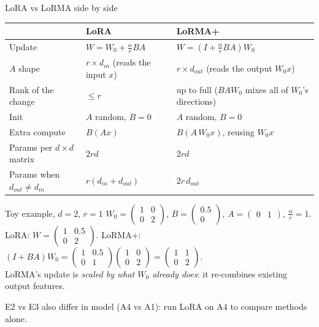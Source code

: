 \documentclass[aspectratio=169,11pt]{beamer}
\begin{document}
\begin{frame}{LoRA vs LoRMA side by side}
  \footnotesize
  \begin{center}
  \begin{tabular}{@{}lll@{}}
    \toprule
    & LoRA & LoRMA+ \\
    \midrule
    Update & $W = W_0 + \frac{\alpha}{r}BA$ & $W = (I + \frac{\alpha}{r}BA)W_0$ \\
    $A$ shape & $r \times d_{in}$ (reads the input $x$) & $r \times d_{out}$ (reads the output $W_0x$) \\
    Rank of the change & $\le r$ & up to full ($BAW_0$ mixes all of $W_0$'s directions) \\
    Init & $A$ random, $B=0$ & $A$ random, $B=0$ \\
    Extra compute & $B(Ax)$ & $B(A\,W_0x)$, reusing $W_0x$ \\
    Params per $d\times d$ matrix & $2rd$ & $2rd$ \\
    Params when $d_{out}\ne d_{in}$ & $r(d_{in}+d_{out})$ & $2r\,d_{out}$ \\
    \bottomrule
  \end{tabular}
  \end{center}
  \begin{block}{Toy example, $d=2$, $r=1$}
    $W_0 = \begin{pmatrix}1&0\\0&2\end{pmatrix}$, $B = \begin{pmatrix}0.5\\0\end{pmatrix}$, $A = \begin{pmatrix}0&1\end{pmatrix}$, $\frac{\alpha}{r}=1$.\quad
    LoRA: $W = \begin{pmatrix}1&0.5\\0&2\end{pmatrix}$.\quad
    LoRMA+: $(I+BA)W_0 = \begin{pmatrix}1&0.5\\0&1\end{pmatrix}\begin{pmatrix}1&0\\0&2\end{pmatrix} = \begin{pmatrix}1&1\\0&2\end{pmatrix}$.\\
    LoRMA's update is \emph{scaled by what $W_0$ already does}: it re-combines existing output features.
  \end{block}
  {\scriptsize E2 vs E3 also differ in model (A4 vs A1): run LoRA on A4 to compare methods alone.}
\end{frame}
\end{document}
